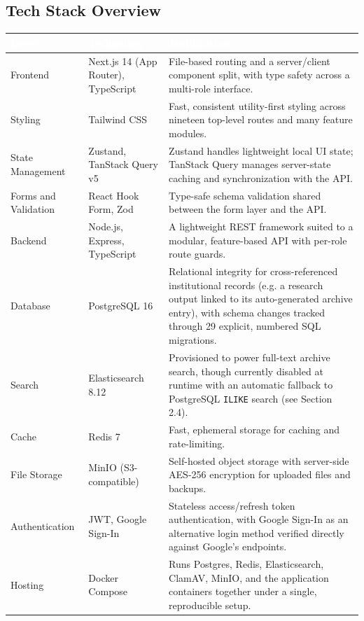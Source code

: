 \documentclass[12pt]{article}
\begin{document}
\subsection{Tech Stack Overview}
\renewcommand{\arraystretch}{1.3}
\begin{longtable}{|L{2.8cm}|L{4.2cm}|L{6.5cm}|}
\hline
{} \textcolor{white}{\bfseries Layer} & \textcolor{white}{\bfseries Technology} & \textcolor{white}{\bfseries Justification} \\
\hline
Frontend & Next.js 14 (App Router), TypeScript & File-based routing and a server/client component split, with type safety across a multi-role interface. \\
\hline
Styling & Tailwind CSS & Fast, consistent utility-first styling across nineteen top-level routes and many feature modules. \\
\hline
State Management & Zustand, TanStack Query v5 & Zustand handles lightweight local UI state; TanStack Query manages server-state caching and synchronization with the API. \\
\hline
Forms and Validation & React Hook Form, Zod & Type-safe schema validation shared between the form layer and the API. \\
\hline
Backend & Node.js, Express, TypeScript & A lightweight REST framework suited to a modular, feature-based API with per-role route guards. \\
\hline
Database & PostgreSQL 16 & Relational integrity for cross-referenced institutional records (e.g. a research output linked to its auto-generated archive entry), with schema changes tracked through 29 explicit, numbered SQL migrations. \\
\hline
Search & Elasticsearch 8.12 & Provisioned to power full-text archive search, though currently disabled at runtime with an automatic fallback to PostgreSQL \texttt{ILIKE} search (see Section 2.4). \\
\hline
Cache & Redis 7 & Fast, ephemeral storage for caching and rate-limiting. \\
\hline
File Storage & MinIO (S3-compatible) & Self-hosted object storage with server-side AES-256 encryption for uploaded files and backups. \\
\hline
Authentication & JWT, Google Sign-In & Stateless access/refresh token authentication, with Google Sign-In as an alternative login method verified directly against Google's endpoints. \\
\hline
Hosting & Docker Compose & Runs Postgres, Redis, Elasticsearch, ClamAV, MinIO, and the application containers together under a single, reproducible setup. \\
\hline
\end{longtable}
\end{document}
